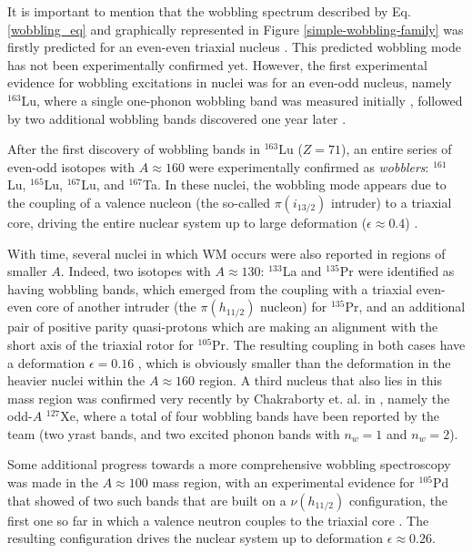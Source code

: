 \documentclass[11pt]{article}
\begin{document}
It is important to mention that the wobbling spectrum described by Eq. \ref{wobbling_eq} and graphically represented in Figure \ref{simple-wobbling-family} was firstly predicted for an even-even triaxial nucleus \cite{bohr1998nuclear}. This predicted wobbling mode has not been experimentally confirmed yet. However, the first experimental evidence for wobbling excitations in nuclei was for an even-odd nucleus, namely $^{163}$Lu, where a single one-phonon wobbling band was measured initially \cite{odegaard2001evidence}, followed by two additional wobbling bands discovered one year later \cite{jensen2002evidence,jensen2002wobbling}.

After the first discovery of wobbling bands in $^{163}$Lu ($Z=71$), an entire series of even-odd isotopes with $A\approx160$ were experimentally confirmed as \emph{wobblers}: $^{161}$Lu, $^{165}$Lu, $^{167}$Lu, and $^{167}$Ta. In these nuclei, the wobbling mode appears due to the coupling of a valence nucleon (the so-called $\pi(i_{13/2})$ intruder) to a triaxial core, driving the entire nuclear system up to large deformation ($\epsilon\approx0.4$) \cite{schnack1995superdeformed}.

With time, several nuclei in which WM occurs were also reported in regions of smaller $A$. Indeed, two isotopes with $A\approx130$: $^{133}$La \cite{biswas2019longitudinal} and $^{135}$Pr \cite{matta2017transverse,sensharma2019two} were identified as having wobbling bands, which emerged from the coupling with a triaxial even-even core of another intruder (the $\pi(h_{11/2})$ nucleon) for $^{135}$Pr, and an additional pair of positive parity quasi-protons which are making an alignment with the short axis of the triaxial rotor for $^{105}$Pr. The resulting coupling in both cases have a deformation $\epsilon=0.16$ \cite{matta2017transverse,biswas2019longitudinal}, which is obviously smaller than the deformation in the heavier nuclei within the $A\approx160$ region. A third nucleus that also lies in this mass region was confirmed very recently by Chakraborty et. al. in \cite{chakraborty2020multiphonon}, namely the odd-$A$ $^{127}$Xe, where a total of four wobbling bands have been reported by the team (two yrast bands, and two excited phonon bands with $n_w=1$ and $n_w=2$).

Some additional progress towards a more comprehensive wobbling spectroscopy was made in the $A\approx100$ mass region, with an experimental evidence for $^{105}$Pd that showed of two such bands that are built on a $\nu(h_{11/2})$ configuration, the first one so far in which a valence neutron couples to the triaxial core \cite{timar2019experimental}. The resulting configuration drives the nuclear system up to deformation $\epsilon\approx0.26$.
\end{document}
